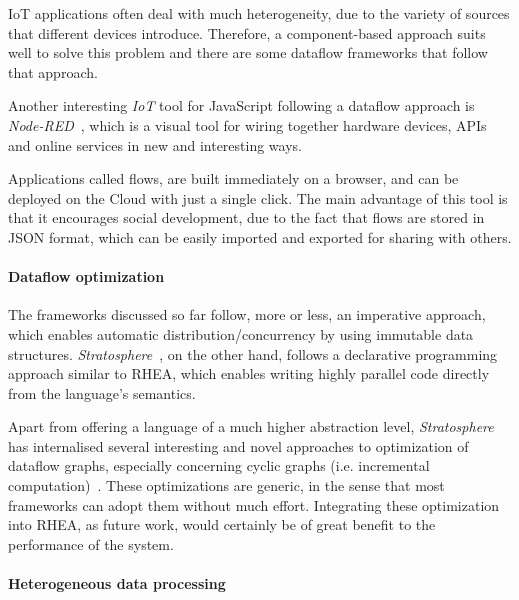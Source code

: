 \documentclass[sigplan,review,anonymous]{acmart}
\begin{document}
IoT applications often deal with much heterogeneity, due to the variety of
sources that different devices introduce. Therefore, a component-based approach
suits well to solve this problem and there are some dataflow frameworks that
follow that approach.

Another interesting \textit{IoT} tool for JavaScript following a dataflow
approach is \textit{Node-RED}~\cite{node-red}, which is a visual tool for wiring
together hardware devices, APIs and online services in new and interesting ways.

Applications called flows, are built immediately on a browser, and can be
deployed on the Cloud with just a single click. The main advantage of this tool
is that it encourages social development, due to the fact that flows are stored
in JSON format, which can be easily imported and exported for sharing with
others.

\paragraph{Dataflow optimization}

The frameworks discussed so far follow, more or less, an imperative approach,
which enables automatic distribution/concurrency by using immutable data
structures. \textit{Stratosphere}~\cite{stratosphere}, on the other hand, follows
a declarative programming approach similar to \textsc{RHEA}, which enables
writing highly parallel code directly from the language's semantics.

Apart from offering a language of a much higher abstraction level,
\textit{Stratosphere} has internalised several interesting and novel approaches
to optimization of dataflow graphs, especially concerning cyclic graphs (i.e.
incremental computation)~\cite{spinning}. These optimizations are generic, in the
sense that most frameworks can adopt them without much effort. Integrating these
optimization into \textsc{RHEA}, as future work, would certainly be of great
benefit to the performance of the system.

\paragraph{Heterogeneous data processing}
\end{document}
